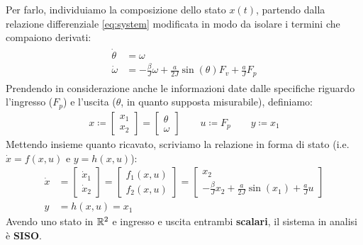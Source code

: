 \documentclass[a4paper, 11pt]{article}
\begin{document}
Per farlo, individuiamo la composizione dello stato $x(t)$,  partendo dalla relazione differenziale \eqref{eq:system} modificata in modo da isolare i termini che compaiono derivati:
\begin{align*}
	\begin{aligned}
		\dot \theta & = \omega \\
		\dot \omega & = -\frac{\beta}{J} \omega + \frac{a}{2J} \sin(\theta) F_v + \frac{a}{J} F_p
	\end{aligned}
\end{align*}
Prendendo in considerazione anche le informazioni date dalle specifiche riguardo l'ingresso ($F_p$) e l'uscita ($\theta$, in quanto supposta misurabile), definiamo:
\begin{align*}
	x \coloneqq \begin{bmatrix}
		x_1 \\ x_2
	\end{bmatrix} = \begin{bmatrix}
		\theta \\ \omega
	\end{bmatrix} \quad \quad u \coloneqq F_p \quad \quad y \coloneqq x_1
\end{align*}
Mettendo insieme quanto ricavato, scriviamo la relazione in forma di stato (i.e. $\dot x = f(x, u)$ e $y = h(x, u)$):
\begin{subequations}\label{eq:fds}
\begin{align}
	\dot x & = \begin{bmatrix}
		\dot x_1 \\ \dot x_2
	\end{bmatrix} = \begin{bmatrix} 
		f_1(x, u) \\ f_2(x, u)
	\end{bmatrix} = \begin{bmatrix}
		x_2 \\ -\frac{\beta}{J} x_2 + \frac{a}{2J} \sin(x_1) + \frac{a}{J} u
	\end{bmatrix} \\
	y & = h(x, u) =  x_1
\end{align}
\end{subequations}
Avendo uno stato in $\mathbb{R}^2$ e ingresso e uscita entrambi \textbf{scalari}, il sistema in analisi è \textbf{SISO}.
\end{document}
